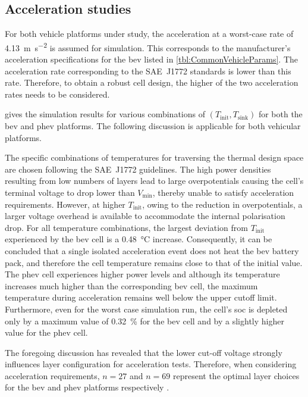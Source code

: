 \subsection{Acceleration studies}

For both vehicle platforms under study, the acceleration at a worst-case rate of
\SI{4.13}{\meter\per\second\squared} is assumed for simulation. This corresponds
to the  manufacturer's acceleration specifications  for the \gls{bev}  listed in
\cref{tbl:CommonVehicleParams}.  The  acceleration  rate  corresponding  to  the
SAE~J1772 standards is lower than this  rate. Therefore, to obtain a robust cell
design, the higher of the two acceleration rates needs to be considered.

  gives the  simulation  results  for various  combinations
of  $(T_\text{init},  T_\text{sink})$  for  both the  \gls{bev}  and  \gls{phev}
platforms. The following discussion is applicable for both vehicular platforms.



The  specific combinations  of temperatures  for traversing  the thermal  design
space are  chosen following the  SAE~J1772 guidelines. The high  power densities
resulting from  low numbers of layers  lead to large overpotentials  causing the
cell's terminal  voltage to  drop lower than  $V_\text{min}$, thereby  unable to
satisfy acceleration requirements. However,  at higher $T_\text{init}$, owing to
the  reduction in  overpotentials, a  larger  voltage overhead  is available  to
accommodate the  internal polarisation  drop. For all  temperature combinations,
the largest deviation from $T_\text{init}$  experienced by the \gls{bev} cell is
a \SI{0.48}{\degreeCelsius} increase.  Consequently, it can be  concluded that a
single isolated acceleration event does not heat the \gls{bev} battery pack, and
therefore the cell  temperature remains close to that of  the initial value. The
\gls{phev} cell  experiences higher  power levels  and although  its temperature
increases  much  higher  than  the corresponding  \gls{bev}  cell,  the  maximum
temperature  during acceleration  remains  well below  the  upper cutoff  limit.
Furthermore, even  for the worst  case simulation  run, the cell's  \gls{soc} is
depleted only by  a maximum value of \SI{0.32}{\percent} for  the \gls{bev} cell
and by a slightly higher value for the \gls{phev} cell.

The foregoing  discussion has revealed  that the lower cut-off  voltage strongly
influences  layer   configuration  for   acceleration  tests.   Therefore,  when
considering acceleration requirements, $n = 27$ and $n=69$ represent the optimal
layer choices for the \gls{bev} and \gls{phev} platforms respectively .

